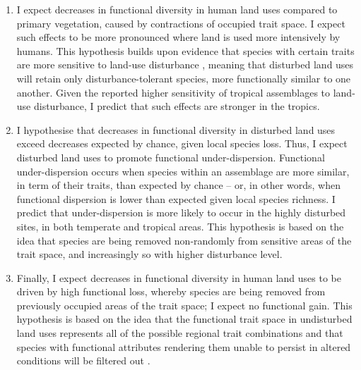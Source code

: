 \begin{enumerate}
\item I expect decreases in functional diversity in human land uses compared to primary vegetation, caused by contractions of occupied trait space. I expect such effects to be more pronounced where land is used more intensively by humans. This hypothesis builds upon evidence that species with certain traits are more sensitive to land-use disturbance \citep{Newbold2013}, meaning that disturbed land uses will retain only disturbance-tolerant species, more functionally similar to one another. Given the reported higher sensitivity of tropical assemblages to land-use disturbance, I predict that such effects are stronger in the tropics.
\item I hypothesise that decreases in functional diversity in disturbed land uses exceed decreases expected by chance, given local species loss. Thus, I expect disturbed land uses to promote functional under-dispersion. Functional under-dispersion occurs when species within an assemblage are more similar, in term of their traits, than expected by chance \citep{Cadotte2017, Wong2018} -- or, in other words, when functional dispersion is lower than expected given local species richness. I predict that under-dispersion is more likely to occur in the highly disturbed sites, in both temperate and tropical areas. This hypothesis is based on the idea that species are being removed non-randomly from sensitive areas of the trait space, and increasingly so with higher disturbance level.
\item Finally, I expect decreases in functional diversity in human land uses to be driven by high functional loss, whereby species are being removed from previously occupied areas of the trait space; I expect no functional gain. This hypothesis is based on the idea that the functional trait space in undisturbed land uses represents all of the possible regional trait combinations and that species with functional attributes rendering them unable to persist in altered conditions will be filtered out \citep{Cornwell2006}.
\end{enumerate}

